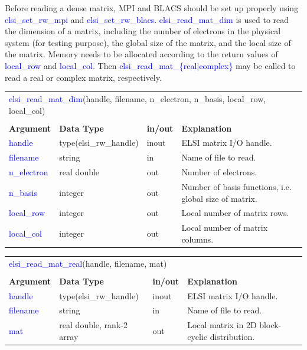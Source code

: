 \documentclass{report}
\newcommand{\tcb}[1]{\textcolor{blue}{#1}}
\begin{document}
Before reading a dense matrix, MPI and BLACS should be set up properly using \tcb{elsi\_set\_rw\_mpi} and \tcb{elsi\_set\_rw\_blacs}. \tcb{elsi\_read\_mat\_dim} is used to read the dimension of a matrix, including the number of electrons in the physical system (for testing purpose), the global size of the matrix, and the local size of the matrix. Memory needs to be allocated according to the return values of \tcb{local\_row} and \tcb{local\_col}. Then \tcb{elsi\_read\_mat\_\{real$\vert$complex\}} may be called to read a real or complex matrix, respectively.

\begin{tabular}[]{|p{20mm}|p{45mm}|p{15mm}|p{85mm}|}
\multicolumn{4}{l}{\tcb{elsi\_read\_mat\_dim}(handle, filename, n\_electron, n\_basis, local\_row, local\_col)}\\
\multicolumn{4}{l}{}\\
\hline
\multicolumn{1}{|l|}{\textbf{Argument}} & \multicolumn{1}{l|}{\textbf{Data Type}} & \multicolumn{1}{l|}{\textbf{in/out}} & \multicolumn{1}{l|}{\textbf{Explanation}}\\
\hline
\tcb{handle}      & type(elsi\_rw\_handle) & inout & ELSI matrix I/O handle.\\
\hline
\tcb{filename}    & string                 & in    & Name of file to read.\\
\hline
\tcb{n\_electron} & real double            & out   & Number of electrons.\\
\hline
\tcb{n\_basis}    & integer                & out   & Number of basis functions, i.e. global size of matrix.\\
\hline
\tcb{local\_row}  & integer                & out   & Local number of matrix rows.\\
\hline
\tcb{local\_col}  & integer                & out   & Local number of matrix columns.\\
\hline
\end{tabular}

\begin{tabular}[]{|p{20mm}|p{45mm}|p{15mm}|p{85mm}|}
\multicolumn{4}{l}{\tcb{elsi\_read\_mat\_real}(handle, filename, mat)}\\
\multicolumn{4}{l}{}\\
\hline
\multicolumn{1}{|l|}{\textbf{Argument}} & \multicolumn{1}{l|}{\textbf{Data Type}} & \multicolumn{1}{l|}{\textbf{in/out}} & \multicolumn{1}{l|}{\textbf{Explanation}}\\
\hline
\tcb{handle}   & type(elsi\_rw\_handle)    & inout & ELSI matrix I/O handle.\\
\hline
\tcb{filename} & string                    & in    & Name of file to read.\\
\hline
\tcb{mat}      & real double, rank-2 array & out   & Local matrix in 2D block-cyclic distribution.\\
\hline
\end{tabular}
\end{document}
